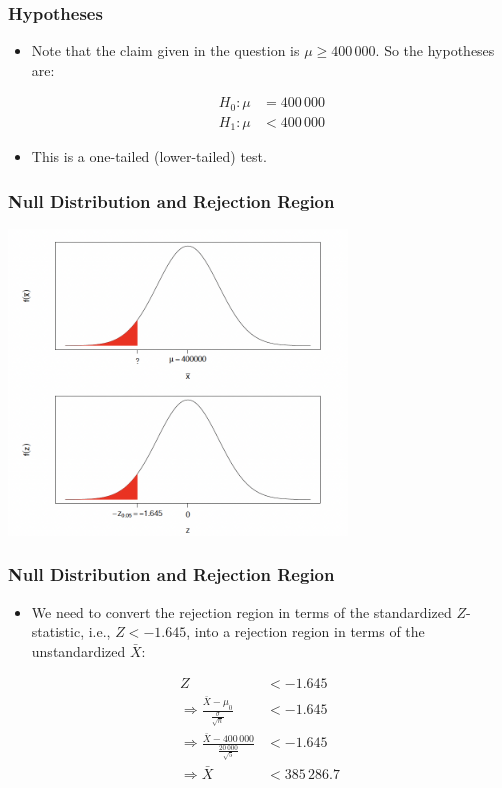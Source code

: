 \documentclass[14pt]{beamer}
\begin{document}
\begin{frame}
	\frametitle{Hypotheses}
	
	\begin{itemize}[label={\color{blue}$\blacktriangleright$}]
		\item Note that the claim given in the question is $\mu \geq 400\,000$. So the hypotheses are:
		
		\[
		\begin{aligned}
			H_0 : \mu &= 400\,000 \\
			H_1 : \mu &< 400\,000
		\end{aligned}
		\]
		
		\item This is a one-tailed (lower-tailed) test.
	\end{itemize}
	
\end{frame}
\begin{frame}
	\frametitle{Null Distribution and Rejection Region}
	
	\centering
	\includegraphics[width=9cm]{null.png}	
	
\end{frame}
\begin{frame}
	\frametitle{Null Distribution and Rejection Region}
	
	\begin{itemize}[label={\color{blue}$\blacktriangleright$}]
		\item We need to convert the rejection region in terms of the standardized $Z$-statistic, i.e., $Z < -1.645$, into a rejection region in terms of the unstandardized $\bar{X}$:
	\end{itemize}
	
	\begin{align*}
		Z &< -1.645 \\[1ex]
		\Rightarrow \frac{\bar{X} - \mu_0}{\frac{\sigma}{\sqrt{n}}} &< -1.645 \\[1ex]
		\Rightarrow \frac{\bar{X} - 400\,000}{\frac{20\,000}{\sqrt{5}}} &< -1.645 \\[1ex]
		\Rightarrow \bar{X} &< 385\,286.7
	\end{align*}
	
\end{frame}
\end{document}

